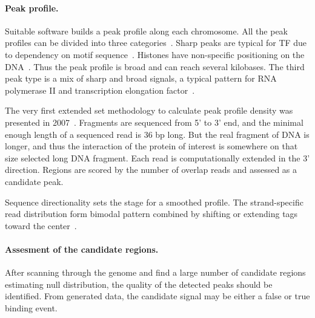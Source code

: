 \paragraph{Peak profile.}
Suitable software builds a peak profile along each chromosome. 
All the peak profiles can be divided into three categories~\cite{park2009chip}. 
Sharp peaks are typical for TF due to dependency on motif sequence~\cite{landt2012chip}. 
Histones have non-specific positioning on the DNA~\cite{krig2007identification}. 
Thus the peak profile is broad and can reach several kilobases. 
The third peak type is a mix of sharp and broad signals, a typical pattern for RNA polymerase II and transcription elongation factor~\cite{squazzo2006suz12, lin2011dynamic}.



The very first extended set methodology to calculate peak profile density was presented in 2007~\cite{robertson2007genome}. 
Fragments are sequenced from 5' to 3' end, and the minimal enough length of a sequenced read is 36 bp long. 
But the real fragment of DNA is longer, and thus the interaction of the protein of interest is somewhere on that size selected long DNA fragment. 
Each read is computationally extended in the 3' direction. 
Regions are scored by the number of overlap reads and assessed as a candidate peak.



Sequence directionality sets the stage for a smoothed profile. 
The strand-specific read distribution form bimodal pattern combined by shifting or extending tags toward the center~\cite{valouev2008genome}.









\paragraph{Assesment of the candidate regions.}
After scanning through the genome and find a large number of candidate regions estimating null distribution, the quality of the detected peaks should be identified. 
From generated data, the candidate signal may be either a false or true binding event. 

